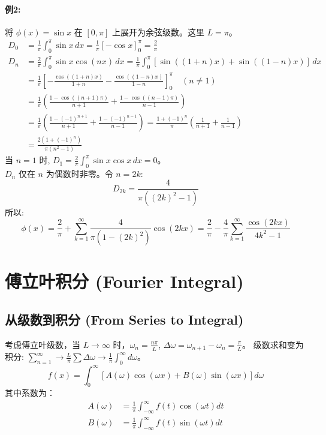 \documentclass{article}
\begin{document}
	\paragraph{例2:} 将 $\phi(x) = \sin x$ 在 $[0, \pi]$ 上展开为余弦级数。这里 $L=\pi$。
	\begin{align*}
		D_0 &= \frac{1}{\pi} \int_0^\pi \sin x \, dx = \frac{1}{\pi} [-\cos x]_0^\pi = \frac{2}{\pi} \\
		D_n &= \frac{2}{\pi} \int_0^\pi \sin x \cos(nx) \, dx = \frac{1}{\pi} \int_0^\pi [\sin((1+n)x) + \sin((1-n)x)] \, dx \\
		&= \frac{1}{\pi} \left[ -\frac{\cos((1+n)x)}{1+n} - \frac{\cos((1-n)x)}{1-n} \right]_0^\pi \quad (n \ne 1) \\
		&= \frac{1}{\pi} \left( \frac{1-\cos((n+1)\pi)}{n+1} + \frac{1-\cos((n-1)\pi)}{n-1} \right) \\
		&= \frac{1}{\pi} \left( \frac{1-(-1)^{n+1}}{n+1} + \frac{1-(-1)^{n-1}}{n-1} \right) = \frac{1+(-1)^n}{\pi} \left( \frac{1}{n+1} + \frac{1}{n-1} \right) \\
		&= \frac{2(1+(-1)^n)}{\pi(n^2-1)}
	\end{align*}
	当 $n=1$ 时, $D_1 = \frac{2}{\pi} \int_0^\pi \sin x \cos x \, dx = 0$。\\
	$D_n$ 仅在 $n$ 为偶数时非零。令 $n=2k$:
	$$ 
	D_{2k} = \frac{4}{\pi((2k)^2-1)} 
	$$
	所以:
	$$ 
	\phi(x) = \frac{2}{\pi} + \sum_{k=1}^{\infty} \frac{4}{\pi(1-(2k)^2)} \cos(2kx) = \frac{2}{\pi} - \frac{4}{\pi} \sum_{k=1}^{\infty} \frac{\cos(2kx)}{4k^2-1} 
	$$
	
	\section{傅立叶积分 (Fourier Integral)}
	\subsection{从级数到积分 (From Series to Integral)}
	考虑傅立叶级数，当 $L \to \infty$ 时，$\omega_n = \frac{n\pi}{L}$, $\Delta\omega = \omega_{n+1} - \omega_n = \frac{\pi}{L}$。
	级数求和变为积分: $\sum_{n=1}^\infty \to \frac{L}{\pi} \sum \Delta\omega \to \frac{1}{\pi} \int_0^\infty d\omega$。
	$$ 
	f(x) = \int_0^\infty [A(\omega)\cos(\omega x) + B(\omega)\sin(\omega x)] d\omega 
	$$
	其中系数为：
	\begin{align*}
		A(\omega) &= \frac{1}{\pi} \int_{-\infty}^{\infty} f(t) \cos(\omega t) dt \\
		B(\omega) &= \frac{1}{\pi} \int_{-\infty}^{\infty} f(t) \sin(\omega t) dt
	\end{align*}
	
\end{document}
